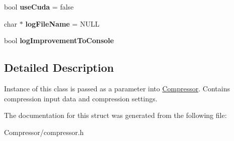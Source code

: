 \begin{DoxyCompactItemize}
\item 
bool {\bfseries use\+Cuda} = false\hypertarget{structlossycompressor_1_1_compressor_args_a3ea105ef6ec81154de29018c425a7376}{}\label{structlossycompressor_1_1_compressor_args_a3ea105ef6ec81154de29018c425a7376}

\item 
char $\ast$ {\bfseries log\+File\+Name} = N\+U\+LL\hypertarget{structlossycompressor_1_1_compressor_args_a2bb8b6669db0602f79db76a6ba7fbc97}{}\label{structlossycompressor_1_1_compressor_args_a2bb8b6669db0602f79db76a6ba7fbc97}

\item 
bool {\bfseries log\+Improvement\+To\+Console}\hypertarget{structlossycompressor_1_1_compressor_args_a7144687ec67d6ba5386eefe96464a9dd}{}\label{structlossycompressor_1_1_compressor_args_a7144687ec67d6ba5386eefe96464a9dd}

\end{DoxyCompactItemize}


\subsection{Detailed Description}
Instance of this class is passed as a parameter into \hyperlink{classlossycompressor_1_1_compressor}{Compressor}. Contains compression input data and compression settings. 

The documentation for this struct was generated from the following file\+:\begin{DoxyCompactItemize}
\item 
Compressor/compressor.\+h\end{DoxyCompactItemize}
